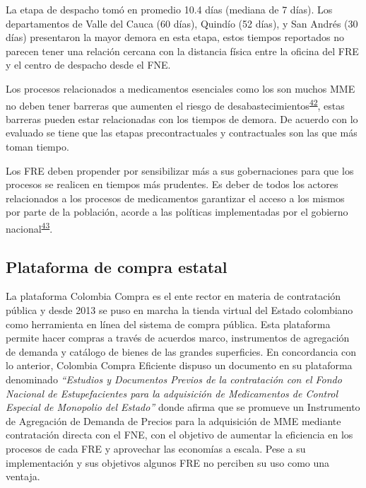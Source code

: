 \documentclass[
]{book}
\begin{document}
La etapa de despacho tomó en promedio 10.4 días (mediana de 7 días). Los departamentos de Valle del Cauca (60 días), Quindío (52 días), y San Andrés (30 días) presentaron la mayor demora en esta etapa, estos tiempos reportados no parecen tener una relación cercana con la distancia física entre la oficina del FRE y el centro de despacho desde el FNE.

Los procesos relacionados a medicamentos esenciales como los son muchos MME no deben tener barreras que aumenten el riesgo de desabastecimientos\textsuperscript{\protect\hyperlink{ref-OMS2021}{42}}, estas barreras pueden estar relacionadas con los tiempos de demora. De acuerdo con lo evaluado se tiene que las etapas precontractuales y contractuales son las que más toman tiempo.

Los FRE deben propender por sensibilizar más a sus gobernaciones para que los procesos se realicen en tiempos más prudentes. Es deber de todos los actores relacionados a los procesos de medicamentos garantizar el acceso a los mismos por parte de la población, acorde a las políticas implementadas por el gobierno nacional\textsuperscript{\protect\hyperlink{ref-PDSPMinSalud2019}{43}}.

\hypertarget{plataforma-de-compra-estatal}{%
\subsection{Plataforma de compra estatal}\label{plataforma-de-compra-estatal}}

La plataforma Colombia Compra es el ente rector en materia de contratación pública y desde 2013 se puso en marcha la tienda virtual del Estado colombiano como herramienta en línea del sistema de compra pública. Esta plataforma permite hacer compras a través de acuerdos marco, instrumentos de agregación de demanda y catálogo de bienes de las grandes superficies. En concordancia con lo anterior, Colombia Compra Eficiente dispuso un documento en su plataforma denominado \emph{``Estudios y Documentos Previos de la contratación con el Fondo Nacional de Estupefacientes para la adquisición de Medicamentos de Control Especial de Monopolio del Estado''} donde afirma que se promueve un Instrumento de Agregación de Demanda de Precios para la adquisición de MME mediante contratación directa con el FNE, con el objetivo de aumentar la eficiencia en los procesos de cada FRE y aprovechar las economías a escala. Pese a su implementación y sus objetivos algunos FRE no perciben su uso como una ventaja.
\end{document}
